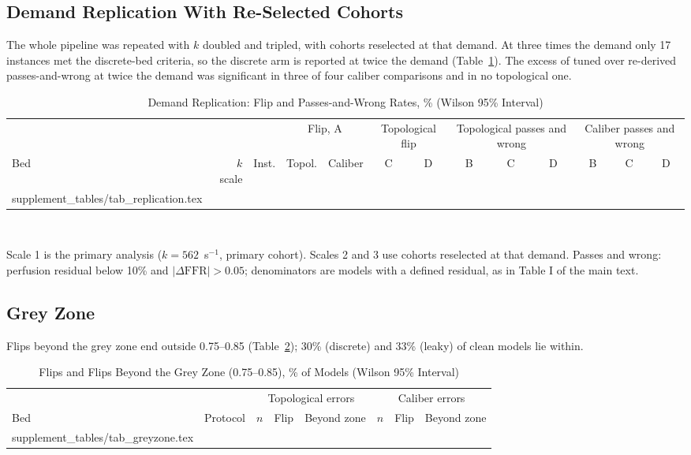 \documentclass[journal,twoside,web,onecolumn]{ieeecolor}
\begin{document}
\subsection{Demand Replication With Re-Selected Cohorts}\label{sec:replication}
The whole pipeline was repeated with $k$ doubled and tripled, with cohorts reselected at that demand. At three times
the demand only 17 instances met the discrete-bed criteria, so the discrete arm is reported at twice the demand
(Table~\ref{tab:repl}). The excess of tuned over re-derived passes-and-wrong at twice the demand was significant in
three of four caliber comparisons and in no topological one.
\begin{table}[!ht]
\caption{Demand Replication: Flip and Passes-and-Wrong Rates, \% (Wilson 95\% Interval)}\label{tab:repl}
\centering\footnotesize\setlength{\tabcolsep}{3pt}
\begin{tabular}{@{}lrrcccccccccc@{}}
\toprule
 & & & \multicolumn{2}{c}{Flip, A} & \multicolumn{2}{c}{Topological flip} & \multicolumn{3}{c}{Topological passes and wrong} & \multicolumn{3}{c}{Caliber passes and wrong}\\
\cmidrule(lr){4-5}\cmidrule(lr){6-7}\cmidrule(lr){8-10}\cmidrule(l){11-13}
Bed & $k$ scale & Inst. & Topol. & Caliber & C & D & B & C & D & B & C & D\\
\midrule
{} supplement_tables/tab_replication.tex 
\bottomrule
\end{tabular}
\\[3pt]
\parbox{0.95\textwidth}{\footnotesize Scale 1 is the primary analysis ($k = 562$~s$^{-1}$, primary cohort). Scales 2 and 3 use
cohorts reselected at that demand. Passes and wrong: perfusion residual below 10\% and $|\Delta\mathrm{FFR}| > 0.05$;
denominators are models with a defined residual, as in Table I of the main text.}
\end{table}

\FloatBarrier
{}
\subsection{Grey Zone}\label{sec:grey}
Flips beyond the grey zone end outside 0.75--0.85 (Table~\ref{tab:grey}); 30\% (discrete) and 33\% (leaky) of clean models lie within.
\begin{table}[!ht]
\caption{Flips and Flips Beyond the Grey Zone (0.75--0.85), \% of Models (Wilson 95\% Interval)}\label{tab:grey}
\centering\footnotesize
\begin{tabular}{@{}llrccrcc@{}}
\toprule
 & & \multicolumn{3}{c}{Topological errors} & \multicolumn{3}{c}{Caliber errors}\\
\cmidrule(lr){3-5}\cmidrule(l){6-8}
Bed & Protocol & $n$ & Flip & Beyond zone & $n$ & Flip & Beyond zone\\
\midrule
{} supplement_tables/tab_greyzone.tex 
\bottomrule
\end{tabular}
\end{table}
\end{document}

